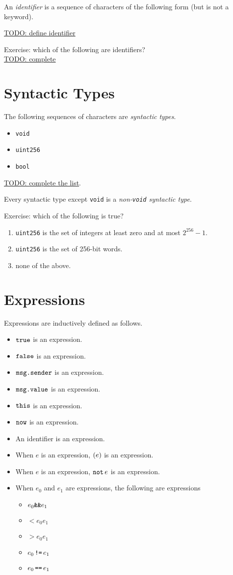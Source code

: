 \documentclass{book}
\newcommand{\todo}[1]{\underline{TODO: {#1}}}
\begin{document}
An \textit{identifier} is a sequence of characters of the following form (but is not a keyword).

\todo{define identifier}


Exercise: which of the following are identifiers? \\
\todo{complete}

\section{Syntactic Types}

The following sequences of characters are \textit{syntactic types}.
\begin{itemize}
\item \texttt{void}
\item \texttt{uint256}
\item \texttt{bool}
\end{itemize}
\todo{complete the list}.

Every syntactic type except \texttt{void} is a \textit{non-\texttt{void} syntactic type}.

Exercise: which of the following is true?
\begin{enumerate}
\item \texttt{uint256} is the set of integers at least zero and at most $2^{256} - 1$.
\item \texttt{uint256} is the set of 256-bit words.
\item none of the above.
\end{enumerate}

\section{Expressions}

Expressions are inductively defined as follows.

\begin{itemize}
\item $\text{\texttt{true}}$ is an expression.
\item $\text{\texttt{false}}$ is an expression.
\item $\text{\texttt{msg.sender}}$ is an expression.
\item $\text{\texttt{msg.value}}$ is an expression.
\item $\text{\texttt{this}}$ is an expression.
\item $\text{\texttt{now}}$ is an expression.
\item An identifier is an expression.
\item When $e$ is an expression, $\mathtt{(}{e}\mathtt{)}$ is an expression.
\item When $e$ is an expression, $\mathop{\text{\texttt{not}}}{e}$ is an expression.
\item When $e_0$ and $e_1$ are expressions, the following are expressions
\begin{itemize}
\item ${e_0}\mathbin{\text{\texttt{\&\&}}{e_1}}$
\item $\lt{e_0}{e_1}$
\item $\gt{e_0}{e_1}$
\item ${e_0} \mathop{\text{\texttt{!=}}} {e_1}$
\item ${e_0} \mathop{\text{\texttt{==}}} {e_1}$
\end{itemize}
\end{itemize}
\end{document}

